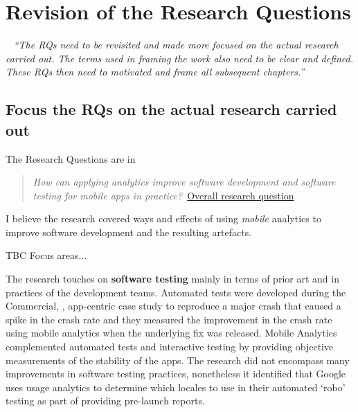 \section{Revision of the Research Questions}~\label{corrections-rqs}
\emph{``The RQs need to be revisited and made more focused on the actual research carried out. The terms used in framing the work also need to be clear and defined. These RQs then need to motivated and frame all subsequent chapters.''}

\subsection{Focus the RQs on the actual research carried out}
The Research Questions are in 

\begin{kaobox}[frametitle=The original RQ]
\begin{quote}
  \emph{How can applying analytics improve software development and software testing for mobile apps in practice?}~\href{overall-research-question}{Overall research question}
\end{quote}    
\end{kaobox}

I believe the research covered ways and effects  of using \emph{mobile} analytics to improve software development and the resulting artefacts.

TBC Focus areas...

The research touches on \textbf{software testing} mainly in terms of prior art and in practices of the development teams. Automated tests were developed during the Commercial, , app-centric case study to reproduce a major crash that caused a spike in the crash rate and they measured the improvement in the crash rate using mobile analytics when the underlying fix was released. Mobile Analytics complemented automated tests and interactive testing by providing objective measurements of the stability of the apps. The research did not encompass many improvements in software testing practices, nonetheless it identified that Google uses usage analytics to determine which locales to use in their automated `robo' testing as part of providing pre-launch reports.

